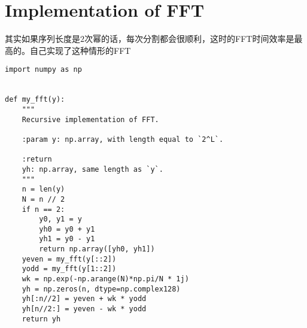 \documentclass[11pt]{article}
\begin{document}
\section{Implementation of FFT}
其实如果序列长度是$2$次幂的话，每次分割都会很顺利，这时的FFT时间效率是最高的。自己实现了这种情形的FFT
\begin{lstlisting}
import numpy as np


def my_fft(y):
	"""
	Recursive implementation of FFT.
	
	:param y: np.array, with length equal to `2^L`.
	
	:return
	yh: np.array, same length as `y`.
	"""
	n = len(y)
	N = n // 2
	if n == 2:
		y0, y1 = y
		yh0 = y0 + y1
		yh1 = y0 - y1
		return np.array([yh0, yh1])
	yeven = my_fft(y[::2])
	yodd = my_fft(y[1::2])
	wk = np.exp(-np.arange(N)*np.pi/N * 1j)
	yh = np.zeros(n, dtype=np.complex128)
	yh[:n//2] = yeven + wk * yodd
	yh[n//2:] = yeven - wk * yodd
	return yh
\end{lstlisting}
\end{document}

